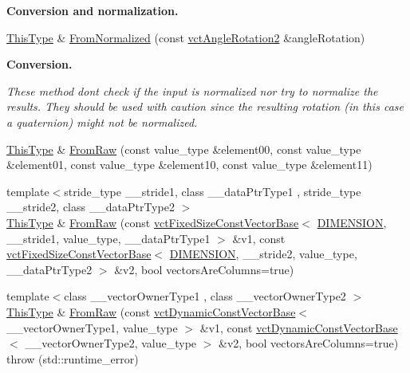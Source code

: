 \begin{Indent}{\bf Conversion and normalization.}
\begin{DoxyCompactItemize}
\item 
\hyperlink{classvct_matrix_rotation2_base_a47ffeef2ddecede4b16bcc88fb432ff5}{This\+Type} \& \hyperlink{classvct_matrix_rotation2_base_a4d40e20f80b262c48616d04b536b45a3}{From\+Normalized} (const \hyperlink{classvct_angle_rotation2}{vct\+Angle\+Rotation2} \&angle\+Rotation)
\end{DoxyCompactItemize}
\end{Indent}
\begin{Indent}{\bf Conversion.}\par
{\em These method don\textquotesingle{}t check if the input is normalized nor try to normalize the results. They should be used with caution since the resulting rotation (in this case a quaternion) might not be normalized. }\begin{DoxyCompactItemize}
\item 
\hyperlink{classvct_matrix_rotation2_base_a47ffeef2ddecede4b16bcc88fb432ff5}{This\+Type} \& \hyperlink{classvct_matrix_rotation2_base_ae633c71e95c1d085e567efcaece4cd0c}{From\+Raw} (const value\+\_\+type \&element00, const value\+\_\+type \&element01, const value\+\_\+type \&element10, const value\+\_\+type \&element11)
\item 
{\footnotesize template$<$stride\+\_\+type \+\_\+\+\_\+stride1, class \+\_\+\+\_\+data\+Ptr\+Type1 , stride\+\_\+type \+\_\+\+\_\+stride2, class \+\_\+\+\_\+data\+Ptr\+Type2 $>$ }\\\hyperlink{classvct_matrix_rotation2_base_a47ffeef2ddecede4b16bcc88fb432ff5}{This\+Type} \& \hyperlink{classvct_matrix_rotation2_base_a35d5e23c707144befb48f8ff25f9bcd9}{From\+Raw} (const \hyperlink{classvct_fixed_size_const_vector_base}{vct\+Fixed\+Size\+Const\+Vector\+Base}$<$ \hyperlink{classvct_matrix_rotation2_base_ac10279ed12ec787b1a4833ea02771348acefb9855f54f0cfd782e785c9083e592}{D\+I\+M\+E\+N\+S\+I\+O\+N}, \+\_\+\+\_\+stride1, value\+\_\+type, \+\_\+\+\_\+data\+Ptr\+Type1 $>$ \&v1, const \hyperlink{classvct_fixed_size_const_vector_base}{vct\+Fixed\+Size\+Const\+Vector\+Base}$<$ \hyperlink{classvct_matrix_rotation2_base_ac10279ed12ec787b1a4833ea02771348acefb9855f54f0cfd782e785c9083e592}{D\+I\+M\+E\+N\+S\+I\+O\+N}, \+\_\+\+\_\+stride2, value\+\_\+type, \+\_\+\+\_\+data\+Ptr\+Type2 $>$ \&v2, bool vectors\+Are\+Columns=true)
\item 
{\footnotesize template$<$class \+\_\+\+\_\+vector\+Owner\+Type1 , class \+\_\+\+\_\+vector\+Owner\+Type2 $>$ }\\\hyperlink{classvct_matrix_rotation2_base_a47ffeef2ddecede4b16bcc88fb432ff5}{This\+Type} \& \hyperlink{classvct_matrix_rotation2_base_ab20891b0ecb689d6824a7430e609cc08}{From\+Raw} (const \hyperlink{classvct_dynamic_const_vector_base}{vct\+Dynamic\+Const\+Vector\+Base}$<$ \+\_\+\+\_\+vector\+Owner\+Type1, value\+\_\+type $>$ \&v1, const \hyperlink{classvct_dynamic_const_vector_base}{vct\+Dynamic\+Const\+Vector\+Base}$<$ \+\_\+\+\_\+vector\+Owner\+Type2, value\+\_\+type $>$ \&v2, bool vectors\+Are\+Columns=true)  throw (std\+::runtime\+\_\+error)

\end{DoxyCompactItemize}
\end{Indent}

